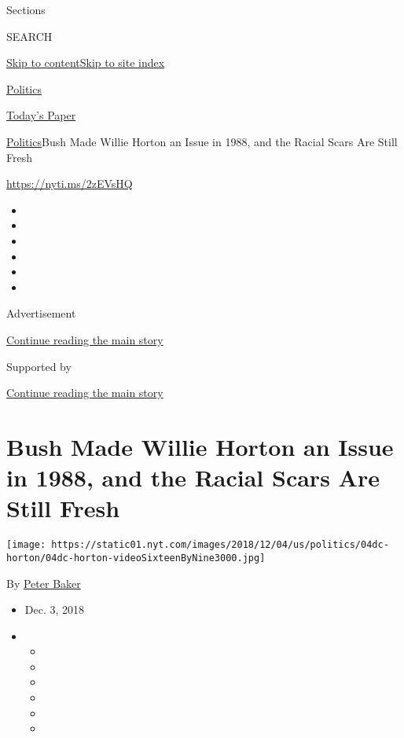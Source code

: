 Sections

SEARCH

\protect\hyperlink{site-content}{Skip to
content}\protect\hyperlink{site-index}{Skip to site index}

\href{https://www.nytimes.com/section/politics}{Politics}

\href{https://myaccount.nytimes.com/auth/login?response_type=cookie\&client_id=vi}{}

\href{https://www.nytimes.com/section/todayspaper}{Today's Paper}

\href{/section/politics}{Politics}\textbar{}Bush Made Willie Horton an
Issue in 1988, and the Racial Scars Are Still Fresh

\url{https://nyti.ms/2zEVsHQ}

\begin{itemize}
\item
\item
\item
\item
\item
\item
\end{itemize}

Advertisement

\protect\hyperlink{after-top}{Continue reading the main story}

Supported by

\protect\hyperlink{after-sponsor}{Continue reading the main story}

\hypertarget{bush-made-willie-horton-an-issue-in-1988-and-the-racial-scars-are-still-fresh}{%
\section{Bush Made Willie Horton an Issue in 1988, and the Racial Scars
Are Still
Fresh}\label{bush-made-willie-horton-an-issue-in-1988-and-the-racial-scars-are-still-fresh}}

\texttt{[image: https://static01.nyt.com/images/2018/12/04/us/politics/04dc-horton/04dc-horton-videoSixteenByNine3000.jpg]}

By \href{https://www.nytimes.com/by/peter-baker}{Peter Baker}

\begin{itemize}
\item
  Dec. 3, 2018
\item
  \begin{itemize}
  \item
  \item
  \item
  \item
  \item
  \item
  \end{itemize}
\end{itemize}

